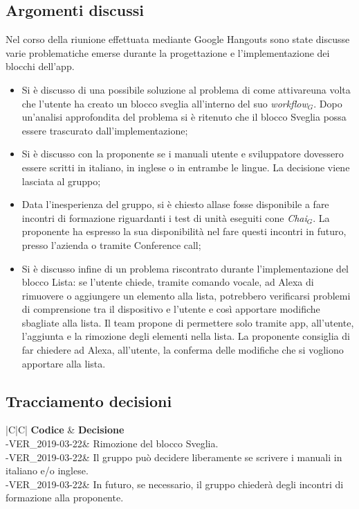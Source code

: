 \documentclass[a4paper,12pt]{article}
\begin{document}
	\subsection{Argomenti discussi}
	Nel corso della riunione effettuata mediante Google Hangouts sono state discusse varie problematiche emerse durante la progettazione e l'implementazione dei blocchi dell'app.
	\begin{itemize}
		\item {Si è discusso di una possibile soluzione al problema di come attivareuna volta che l'utente ha creato un blocco sveglia all'interno del suo \textit{workflow$_{G}$}. Dopo un'analisi approfondita del problema si è ritenuto che il blocco Sveglia possa essere trascurato dall'implementazione;}
		\item {Si è discusso con la proponente se i manuali utente e sviluppatore dovessero essere scritti in italiano, in inglese o in entrambe le lingue. La decisione viene lasciata al gruppo;}
		\item {Data l'inesperienza del gruppo, si è chiesto allase fosse disponibile a fare incontri di formazione riguardanti i test di unità eseguiti cone \textit{Chai$_{G}$}. La proponente ha espresso la sua disponibilità nel fare questi incontri in futuro, presso l'azienda o tramite Conference call;}
		\item {Si è discusso infine di un problema riscontrato durante l'implementazione del blocco Lista: se l'utente chiede, tramite comando vocale, ad Alexa di rimuovere o aggiungere un elemento alla lista, potrebbero verificarsi problemi di comprensione tra il dispositivo e l'utente e così apportare modifiche sbagliate alla lista. Il team propone di permettere solo tramite app, all'utente, l'aggiunta e la rimozione degli elementi nella lista. La proponente consiglia di far chiedere ad Alexa, all'utente, la conferma delle modifiche che si vogliono apportare alla lista.}
	\end{itemize}
	\subsection{Tracciamento decisioni}
	\begin{table}[tbph]
		\centering
		\begin{tabularx}{\textwidth}{|C|C|}
			\hline
			\textbf{Codice } & \textbf{Decisione} \\
			-VER\_2019-03-22& Rimozione del blocco Sveglia.\\
			-VER\_2019-03-22& Il gruppo può decidere liberamente se scrivere i manuali in italiano e/o inglese.\\
			-VER\_2019-03-22& In futuro, se necessario, il gruppo chiederà degli incontri di formazione alla proponente.\\
			\hline
		\end{tabularx}
		\caption{Tracciamento decisioni}
	\end{table}
	\label{LastPage}
\end{document}
